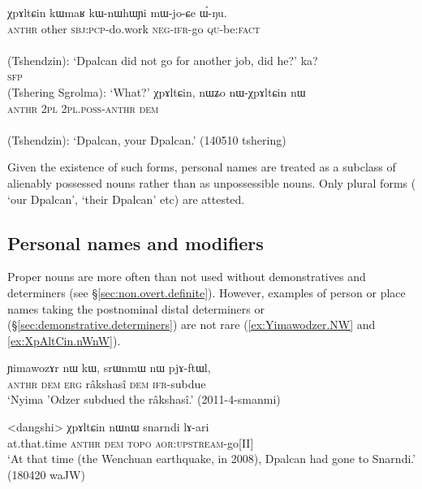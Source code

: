 \begin{exe}
\ex  
\begin{xlist}
\ex 
\gll χpɤltɕin kɯmaʁ kɯ-nɯhɯɲi mɯ-jo-ɕe ɯ́-ŋu. \\
\textsc{anthr} other \textsc{sbj}:\textsc{pcp}-do.work \textsc{neg}-\textsc{ifr}-go \textsc{qu}-be:\textsc{fact} \\
\\
\glt (Tshendzin): `Dpalcan did not go for another job, did he?'
\ex 
\gll ka? \\
\textsc{sfp} \\
\glt (Tshering Sgrolma): `What?'
\ex \label{ex:nWχpAltCin}
\gll χpɤltɕin, nɯʑo nɯ-χpɤltɕin nɯ \\
\textsc{anthr} \textsc{2pl} \textsc{2pl}.\textsc{poss}-\textsc{anthr} \textsc{dem} \\
\\
\glt (Tshendzin): `Dpalcan, your Dpalcan.'  (140510 tshering)
\end{xlist}
\end{exe}

Given the existence of such forms, personal names are treated as a subclass of alienably possessed nouns rather than as unpossessible nouns. Only plural forms ( `our Dpalcan',  `their Dpalcan' etc) are attested.

\subsection{Personal names and modifiers} \label{sec:personal.names.modifiers}
Proper nouns are more often than not used without demonstratives and determiners (see §\ref{sec:non.overt.definite}). However, examples of person or place names taking the postnominal distal determiners  or  (§\ref{sec:demonstrative.determiners}) are not rare (\ref{ex:Yimawodzer.NW} and \ref{ex:XpAltCin.nWnW}).

\begin{exe}
\ex \label{ex:Yimawodzer.NW}
 \gll ɲimawozɤr nɯ kɯ, srɯnmɯ nɯ pjɤ-ftɯl, \\
 \textsc{anthr} \textsc{dem} \textsc{erg} râkshasî \textsc{dem} \textsc{ifr}-subdue \\
 \glt `Nyima 'Odzer subdued the râkshasî.' (2011-4-smanmi)
\end{exe}

\begin{exe}
	\ex \label{ex:XpAltCin.nWnW}
	\gll <dangshi> χpɤltɕin nɯnɯ snarndi lɤ-ari \\
	at.that.time \textsc{anthr} \textsc{dem} \textsc{topo} \textsc{aor}:\textsc{upstream}-go[II] \\
	\glt `At that time (the Wenchuan earthquake, in 2008), Dpalcan had gone to Snarndi.' (180420 waJW)
\end{exe}

